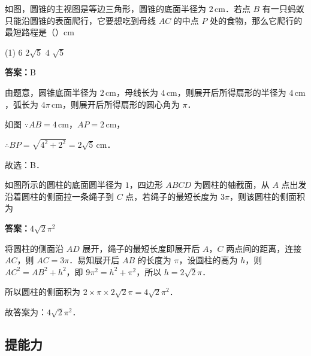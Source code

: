 \vspace{2em}


\begin{example}[\bkstar{3}{5}]
如图，圆锥的主视图是等边三角形，圆锥的底面半径为 $2\,\mathrm{cm}$．若点 $B$ 有一只蚂蚁只能沿圆锥的表面爬行，它要想吃到母线 $AC$ 的中点 $P$ 处的食物，那么它爬行的最短路程是（\qquad）$\mathrm{cm}$
\begin{tasks}(1)
    \task $6$
    \task $2\sqrt{5}$
    \task $4$
    \task $\sqrt{5}$
\end{tasks}
\end{example}
\begin{solution}
\textbf{答案：}B

由题意，圆锥底面半径为 $2\,\mathrm{cm}$，母线长为 $4\,\mathrm{cm}$，则展开后所得扇形的半径为 $4\,\mathrm{cm}$，弧长为 $4\pi\,\mathrm{cm}$，则展开后所得扇形的圆心角为 $\pi$．

如图
$\because AB=4\,\mathrm{cm}$，$AP=2\,\mathrm{cm}$，

$\therefore BP=\sqrt{4^2+2^2}=2\sqrt{5}\,\mathrm{cm}$．

故选：B．
\end{solution}

\vspace{2em}

\begin{example}[\bkstar{3}{5}]
如图所示的圆柱的底面圆半径为 $1$，四边形 $ABCD$ 为圆柱的轴截面，从 $A$ 点出发沿着圆柱的侧面拉一条绳子到 $C$ 点，若绳子的最短长度为 $3\pi$，则该圆柱的侧面积为
\end{example}
\begin{solution}
\textbf{答案：}$4\sqrt{2}\pi^2$

将圆柱的侧面沿 $AD$ 展开，绳子的最短长度即展开后 $A$，$C$ 两点间的距离，连接 $AC$，则 $AC=3\pi$．易知展开后 $AB$ 的长度为 $\pi$，设圆柱的高为 $h$，则 $AC^2=AB^2+h^2$，即 $9\pi^2=h^2+\pi^2$，所以 $h=2\sqrt{2}\pi$．

所以圆柱的侧面积为 $2\times\pi\times 2\sqrt{2}\pi=4\sqrt{2}\pi^2$．

故答案为：$4\sqrt{2}\pi^2$．
\end{solution}

\vspace{2em}

\subsection{提能力}

